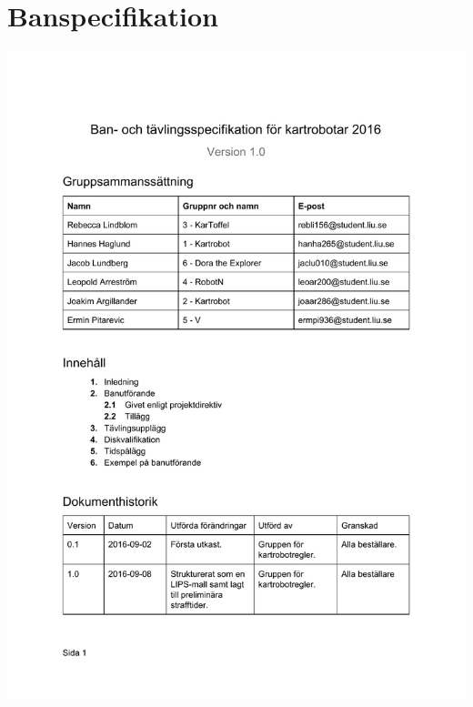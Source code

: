 \documentclass{article}
\begin{document}
\appendix
\clearpage
\section{Banspecifikation}
\label{sec:banspec}
\includegraphics[scale=0.6]{banspec}
\end{document}
